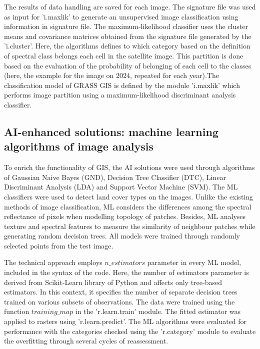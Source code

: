 \documentclass[sn-mathphys-num]{sn-jnl}%
\theoremstyle{thmstyleone}%
\theoremstyle{thmstyletwo}%
\theoremstyle{thmstylethree}%
\begin{document}
{The results of data handling are saved for each image. The signature file was used as input for 'i.maxlik' to generate an unsupervised image classification using information  in signature file. The maximum-likelihood classifier uses the cluster means and covariance matrices obtained from the signature file generated by the 'i.cluster'. Here, the algorithms defines to which category based on the definition of spectral class belongs each cell in the satellite image. This partition is done based on the evaluation of the probability of belonging of each cell to the classes (here, the example for the image on 2024, repeated for each year).The classification model of GRASS GIS is defined by the module 'i.maxlik' which performs image partition using a maximum-likelihood discriminant analysis classifier{.} 

\subsection{AI-enhanced solutions: machine learning algorithms of image analysis}

{To enrich the functionality of GIS, the AI solutions were used through algorithms of Gaussian Naive Bayes (GND), Decision Tree Classifier (DTC), Linear Discriminant Analysis (LDA) and Support Vector Machine (SVM). }The ML classifiers were used to detect {land} cover types {on the} images.{ }Unlike the existing methods of image classification, ML considers the differences among the spectral reflectance of pixels when modelling topology of patches. {Besides, } ML {analyses} texture and spectral features to measure the similarity of {neighbour} patches {while} generating random decision trees.{ }All{ }models were trained {through} randomly selected points from the test image.

The technical approach employs $n\_estimators$ parameter in every ML model, included in the syntax of the code. Here, the number of estimators parameter is derived from Scikit-Learn library of Python and affects only tree-based estimators{. }In this context, it specifies the number of separate decision trees trained on various subsets of observations{.} The data were trained using the function $training\_map$ in the 'r.learn.train' module{.} The fitted { }estimator was applied to rasters using 'r.learn.predict'{.}  The {ML algorithms were} evaluated for performance with the categories checked using the 'r.category' module{ to evaluate the overfitting through several cycles of reassessment.}

}
\end{document}
